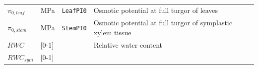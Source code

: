 \documentclass[]{book}
\begin{document}
\begin{longtable}[]{@{}llll@{}}
\begin{minipage}[t]{0.11\columnwidth}
\(\pi_{0,leaf}\)\strut
\end{minipage} & \begin{minipage}[t]{0.10\columnwidth}\raggedright\strut
MPa\strut
\end{minipage} & \begin{minipage}[t]{0.12\columnwidth}\raggedright\strut
\texttt{LeafPI0}\strut
\end{minipage} & \begin{minipage}[t]{0.45\columnwidth}\raggedright\strut
Osmotic potential at full turgor of leaves\strut
\end{minipage}\tabularnewline
\begin{minipage}[t]{0.11\columnwidth}\raggedright\strut
\(\pi_{0,stem}\)\strut
\end{minipage} & \begin{minipage}[t]{0.10\columnwidth}\raggedright\strut
MPa\strut
\end{minipage} & \begin{minipage}[t]{0.12\columnwidth}\raggedright\strut
\texttt{StemPI0}\strut
\end{minipage} & \begin{minipage}[t]{0.45\columnwidth}\raggedright\strut
Osmotic potential at full turgor of symplastic xylem tissue\strut
\end{minipage}\tabularnewline
\begin{minipage}[t]{0.11\columnwidth}\raggedright\strut
\(RWC\)\strut
\end{minipage} & \begin{minipage}[t]{0.10\columnwidth}\raggedright\strut
{[}0-1{]}\strut
\end{minipage} & \begin{minipage}[t]{0.12\columnwidth}\raggedright\strut
\strut
\end{minipage} & \begin{minipage}[t]{0.45\columnwidth}\raggedright\strut
Relative water content\strut
\end{minipage}\tabularnewline
\begin{minipage}[t]{0.11\columnwidth}\raggedright\strut
\(RWC_{sym}\)\strut
\end{minipage} & \begin{minipage}[t]{0.10\columnwidth}\raggedright\strut
{[}0-1{]}\strut
\end{minipage} & \begin{minipage}[t]{0.12\columnwidth}\raggedright\strut
\strut
\end{minipage} & \begin{minipage}[t]{0.45\columnwidth}\raggedright\strut

\end{minipage}
\end{longtable}
\end{document}
